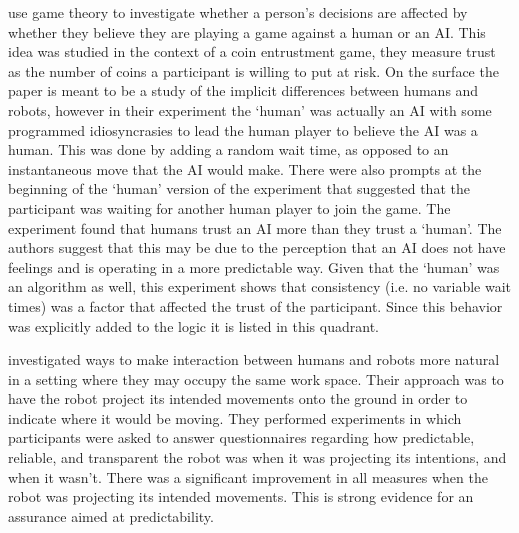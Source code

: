 \citet{Wu2016-ei} use game theory to investigate whether a person's decisions are affected by whether they believe they are playing a game against a human or an AI. This idea was studied in the context of a coin entrustment game, they measure trust as the number of coins a participant is willing to put at risk. On the surface the paper is meant to be a study of the implicit differences between humans and robots, however in their experiment the `human' was actually an AI with some programmed idiosyncrasies to lead the human player to believe the AI was a human. This was done by adding a random wait time, as opposed to an instantaneous move that the AI would make. There were also prompts at the beginning of the `human' version of the experiment that suggested that the participant was waiting for another human player to join the game. The experiment found that humans trust an AI more than they trust a `human'. The authors suggest that this may be due to the perception that an AI does not have feelings and is operating in a more predictable way. Given that the `human' was an algorithm as well, this experiment shows that consistency (i.e. no variable wait times) was a factor that affected the trust of the participant. Since this behavior was explicitly added to the logic it is listed in this quadrant.

\citet{Chadalavada2015-wx} investigated ways to make interaction between humans and robots more natural in a setting where they may occupy the same work space. Their approach was to have the robot project its intended movements onto the ground in order to indicate where it would be moving. They performed experiments in which participants were asked to answer questionnaires regarding how predictable, reliable, and transparent the robot was when it was projecting its intentions, and when it wasn't. There was a significant improvement in all measures when the robot was projecting its intended movements. This is strong evidence for an assurance aimed at predictability.


